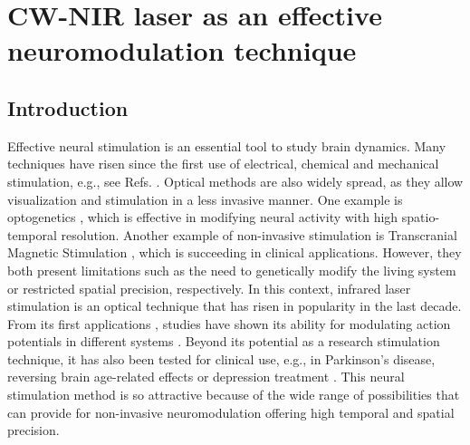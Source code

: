 \chapter{CW-NIR laser as an effective neuromodulation technique}
\label{c-laser}

\section{Introduction}
\label{sect:intro}  %

Effective neural stimulation is an essential tool to study brain dynamics. Many techniques have risen since the first use of electrical, chemical and mechanical stimulation, e.g., see Refs. \cite{cogan_neural_2008, chamorro_generalization_2012, carter_guide_2015, bickle_revolutions_2016}. Optical methods are also widely spread, as they allow visualization \parencite{lecoq_wide_2019} and stimulation in a less invasive manner. One example is optogenetics \parencite{boyden_millisecond-timescale_2005, yizhar_optogenetics_2011, tye_optogenetic_2012,bansal_towards_2022}, which is effective in modifying neural activity with high spatio-temporal resolution. Another example of non-invasive stimulation is Transcranial Magnetic Stimulation \parencite{valero-cabre_transcranial_2017}, which is succeeding in clinical applications. However, they both present limitations such as the need to genetically modify the living system or restricted spatial precision, respectively. In this context, infrared laser stimulation is an optical technique that has risen in popularity in the last decade. From its first applications \parencite{wells_application_2005, izzo_optical_2007}, studies have shown its ability for modulating action potentials in different systems \parencite{liang_temperature-dependent_2009, goyal_acute_2012, brown_thermal_2020, barrett_pulsed_2018, shapiro_infrared_2012, cayce_infrared_2014, begeng_activity_2022}. Beyond its potential as a research stimulation technique, it has also been tested for clinical use, e.g., in Parkinson's disease, reversing brain age-related effects or depression treatment \parencite{konstantinovic_transcranial_2013, disner_transcranial_2016, wang_impact_2017, saucedo_transcranial_2021, pan_infrared_2023}. This neural stimulation method is so attractive because of the wide range of possibilities that can provide for non-invasive neuromodulation offering high temporal and spatial precision.
	
